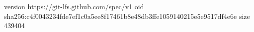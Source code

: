 version https://git-lfs.github.com/spec/v1
oid sha256:c4f0043234fde7ef1c0a5ee8f17461b8e48db3ffe1059140215e5e9517df4e6e
size 439404
